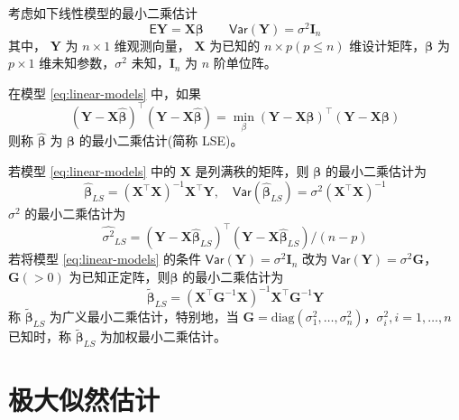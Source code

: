 \documentclass[12pt,a4paper,UTF8,twoside]{book}
\theoremstyle{definition}
\theoremstyle{definition}
\theoremstyle{definition}
\theoremstyle{remark}
\let\BeginKnitrBlock\begin \let\EndKnitrBlock\end
\begin{document}
考虑如下线性模型的最小二乘估计
\begin{equation}
\mathsf{E}\mathbf{Y} = \mathbf{X}\boldsymbol{\beta} \qquad \mathsf{Var}(\mathbf{Y}) = \sigma^2 \mathbf{I}_{n} \label{eq:linear-models}
\end{equation}
\noindent 其中， \(\mathbf{Y}\) 为 \(n \times 1\) 维观测向量， \(\mathbf{X}\) 为已知的 \(n \times p (p \leq n)\) 维设计矩阵，\(\boldsymbol{\beta}\) 为 \(p \times 1\) 维未知参数，\(\sigma^2\) 未知，\(\mathbf{I}_{n}\) 为 \(n\) 阶单位阵。
\BeginKnitrBlock{definition}[最小二乘估计]
\protect\hypertarget{def:least-squares-estimate}{}{\label{def:least-squares-estimate} \iffalse (最小二乘估计) \fi{} }在模型 \eqref{eq:linear-models} 中，如果
\begin{equation}
(\mathbf{Y} - \mathbf{X}\hat{\boldsymbol{\beta}})^{\top}(\mathbf{Y} - \mathbf{X}\hat{\boldsymbol{\beta}}) = \min_{\beta}(\mathbf{Y} - \mathbf{X}\boldsymbol{\beta})^{\top}(\mathbf{Y} - \mathbf{X}\boldsymbol{\beta}) \label{eq:least-squares}
\end{equation}
\noindent 则称 \(\hat{\boldsymbol{\beta}}\) 为 \(\boldsymbol{\beta}\) 的最小二乘估计(简称 LSE)\citep{wang2004}。
\EndKnitrBlock{definition}

\BeginKnitrBlock{theorem}[最小二乘估计]
\protect\hypertarget{thm:unbiased}{}{\label{thm:unbiased} \iffalse (最小二乘估计) \fi{} }若模型 \eqref{eq:linear-models} 中的 \(\mathbf{X}\) 是列满秩的矩阵，则 \(\boldsymbol{\beta}\) 的最小二乘估计为
\[
\hat{\boldsymbol{\beta}}_{LS} = ( \mathbf{X}^{\top}\mathbf{X} )^{-1}\mathbf{X}^{\top} \mathbf{Y}, \quad  \mathsf{Var}(\hat{\boldsymbol{\beta}}_{LS}) = \sigma^2 (\mathbf{X}^{\top}\mathbf{X})^{-1}  
\]
\noindent \(\sigma^2\) 的最小二乘估计为
\[
\hat{\sigma^2}_{LS} = (\mathbf{Y} - \mathbf{X}\hat{\boldsymbol{\beta}}_{LS})^{\top}(\mathbf{Y} - \mathbf{X}\hat{\boldsymbol{\beta}}_{LS})/(n - p)
\]
若将模型 \eqref{eq:linear-models} 的条件 \(\mathsf{Var}(\mathbf{Y}) = \sigma^2 \mathbf{I}_{n}\) 改为 \(\mathsf{Var}(\mathbf{Y}) = \sigma^2 \mathbf{G}\)， \(\mathbf{G}(>0)\) 为已知正定阵，则\(\boldsymbol{\beta}\) 的最小二乘估计为
\[
\tilde{\boldsymbol{\beta}}_{LS} = ( \mathbf{X}^{\top} \mathbf{G}^{-1} \mathbf{X})^{-1} \mathbf{X}^{\top} \mathbf{G}^{-1} \mathbf{Y} 
\]
\noindent 称 \(\tilde{\boldsymbol{\beta}}_{LS}\) 为广义最小二乘估计，特别地，当 \(\mathbf{G} = \mathrm{diag}(\sigma^2_{1},\ldots,\sigma^2_{n})\)，\(\sigma^2_{i},i = 1,\ldots,n\) 已知时，称 \(\tilde{\boldsymbol{\beta}}_{LS}\) 为加权最小二乘估计\citep{wang2004}。
\EndKnitrBlock{theorem}

\hypertarget{sec:def-mle}{%
\section{极大似然估计}\label{sec:def-mle}}
\end{document}
